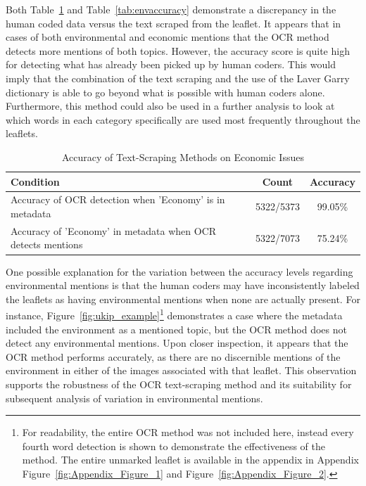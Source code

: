\documentclass[preprint,12pt,authoryear]{elsarticle}
\begin{document}
Both Table~\ref{tab:econaccuracy} and Table~\ref{tab:envaccuracy} demonstrate a discrepancy in the human coded data versus the text scraped from the leaflet. It appears that in cases of both environmental and economic mentions that the OCR method detects more mentions of both topics. However, the accuracy score is quite high for detecting what has already been picked up by human coders. This would imply that the combination of the text scraping and the use of the Laver Garry dictionary is able to go beyond what is possible with human coders alone. Furthermore, this method could also be used in a further analysis to look at which words in each category specifically are used most frequently throughout the leaflets. 

\vspace{1cm}

\begin{table}[!htbp]
	\centering
	\caption{Accuracy of Text-Scraping Methods on Economic Issues}
	\label{tab:econaccuracy}
	\begin{tabular}{p{}cc}
			\hline
			Condition & Count & Accuracy \\
			\hline
			Accuracy of OCR detection when 'Economy' is in metadata & 5322/5373 & 99.05\% \\
			Accuracy of 'Economy' in metadata when OCR detects mentions & 5322/7073 & 75.24\% \\
			\hline
	\end{tabular}
\end{table}



\vspace{1cm}




One possible explanation for the variation between the accuracy levels regarding environmental mentions is that the human coders may have inconsistently labeled the leaflets as having environmental mentions when none are actually present. For instance, Figure~\ref{fig:ukip_example}\footnote{For readability, the entire OCR method was not included here, instead every fourth word detection is shown to demonstrate the effectiveness of the method. The entire unmarked leaflet is available in the appendix in Appendix Figure~\ref{fig:Appendix_Figure_1} and Figure~\ref{fig:Appendix_Figure_2}.} demonstrates a case where the metadata included the environment as a mentioned topic, but the OCR method does not detect any environmental mentions. Upon closer inspection, it appears that the OCR method performs accurately, as there are no discernible mentions of the environment in either of the images associated with that leaflet. This observation supports the robustness of the OCR text-scraping method and its suitability for subsequent analysis of variation in environmental mentions.
\end{document}
